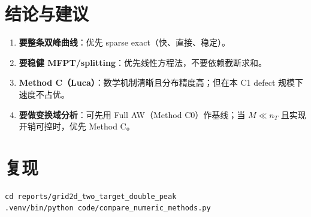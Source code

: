 \documentclass[11pt,a4paper]{ctexart}
\begin{document}
\section{结论与建议}
\begin{enumerate}[leftmargin=2em]
  \item \textbf{要整条双峰曲线}：优先 sparse exact（快、直接、稳定）。
  \item \textbf{要稳健 MFPT/splitting}：优先线性方程法，不要依赖截断求和。
  \item \textbf{Method C（Luca）}：数学机制清晰且分布精度高；但在本 C1 defect 规模下速度不占优。
  \item \textbf{要做变换域分析}：可先用 Full AW（Method C0）作基线；当 $M\ll n_T$ 且实现开销可控时，优先 Method C。
\end{enumerate}

\section*{复现}
\begin{verbatim}
cd reports/grid2d_two_target_double_peak
.venv/bin/python code/compare_numeric_methods.py
\end{verbatim}
\end{document}
